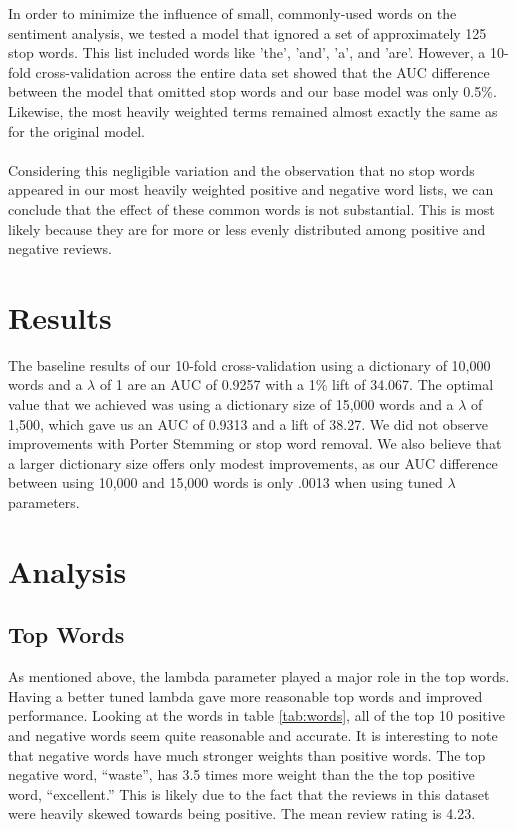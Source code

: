 \documentclass{article}
\begin{document}
In order to minimize the influence of small, commonly-used words on the sentiment analysis, we tested a model that ignored a set of approximately 125 stop words. This list included words like 'the', 'and', 'a', and 'are'. However, a 10-fold cross-validation across the entire data set showed that the AUC difference between the model that omitted stop words and our base model was only 0.5\%. Likewise, the most heavily weighted terms remained almost exactly the same as for the original model.
\\\\Considering this negligible variation and the observation that no stop words appeared in our most heavily weighted positive and negative word lists, we can conclude that the effect of these common words is not substantial. This is most likely because they are for more or less evenly distributed among positive and negative reviews.


\section{Results}
The baseline results of our 10-fold cross-validation using a dictionary of 10,000 words and a $\lambda$ of 1 are an AUC of 0.9257 with a 1\% lift of 34.067. The optimal value that we achieved was using a dictionary size of 15,000 words and a $\lambda$ of 1,500, which gave us an AUC of 0.9313 and a lift of 38.27. We did not observe improvements with Porter Stemming or stop word removal. We also believe that a larger dictionary size offers only modest improvements, as our AUC difference between using 10,000 and 15,000 words is only .0013 when using tuned $\lambda$ parameters.


\section{Analysis}
\subsection{Top Words}
As mentioned above, the lambda parameter played a major role in the top words. Having a better tuned lambda gave more reasonable top words and improved performance. Looking at the words in table \ref{tab:words}, all of the top 10 positive and negative words seem quite reasonable and accurate. It is interesting to note that negative words have much stronger weights than positive words. The top negative word, ``waste'', has 3.5 times more weight than the the top positive word, ``excellent.'' This is likely due to the fact that the reviews in this dataset were heavily skewed towards being positive. The mean review rating is 4.23. 
\end{document}
